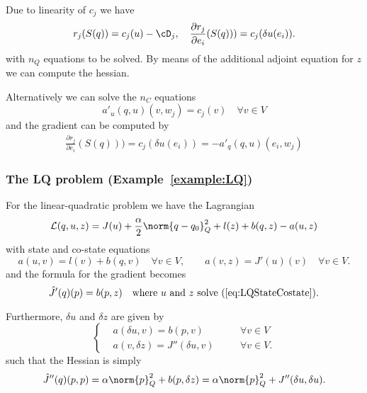 Due to linearity of $c_j$ we have
%
\begin{align*}
r_j(S(q)) = c_j(u)-\cD_j,\quad \frac{\partial r_j}{\partial e_i}(S(q))) = c_j(\delta u(e_i)).
\end{align*}
%
with $n_Q$ equations to be solved. By means of the additional adjoint equation for $z$ we 
can compute the hessian.

Alternatively we can solve the $n_C$ equations
%
\begin{equation}\label{eq:}
a'_u(q,u)(v,  w_j)= c_j(v)\quad\forall v\in V
\end{equation}
%
and the gradient can be computed by
%
\begin{align*}
\frac{\partial r_j}{\partial e_i}(S(q))) = c_j(\delta u(e_i)) = -a'_q(q,u)(e_i, w_j)
\end{align*}
%


%
\subsubsection{The LQ problem (Example~\ref{example:LQ})}
%
For the linear-quadratic problem we have the Lagrangian
%
\begin{equation}\label{eq:LQLagrangian}
\mathcal L(q,u,z) = J(u) + \frac{\alpha}{2}\norm{q-q_0}^2_Q + l(z) + b(q,z) - a(u,z)
\end{equation}
%
with state and co-state equations
\begin{equation}\label{eq:LQStateCostate}
a(u, v)= l(v) + b(q, v)\quad\forall v\in V,\qquad
a(v,z) =J'(u)(v)\quad\forall v\in V.
\end{equation}
and the formula for the gradient becomes
%
\begin{equation}\label{eq:LQGrad}
\hat J'(q)(p) = b(p,z)\quad \mbox{where $u$ and $z$ solve (\ref{eq:LQStateCostate}).}
\end{equation}

Furthermore, $\delta u$ and $\delta z$ are given by
%
\begin{equation}\label{eq:LQSecondStateCostate}
\left\{
%
\begin{aligned}
&a(\delta u, v)= b(p, v)&\quad&\forall v\in V\\
&a(v,\delta z) =J''(\delta u,v)&\quad&\forall v\in V.
\end{aligned}
%
\right.
\end{equation}
%
such that the Hessian is simply
%
\begin{equation}\label{eq:LQHessian}
\hat J''(q)(p,p) = \alpha\norm{p}^2_Q + b(p,\delta z) = \alpha\norm{p}^2_Q + J''(\delta u,\delta u).
\end{equation}
%


